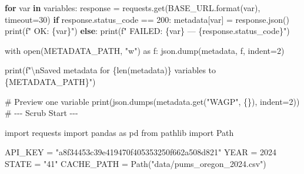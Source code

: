 \documentclass[
  letterpaper,
  DIV=11,
  numbers=noendperiod]{scrartcl}
\newenvironment{Shaded}{\begin{snugshade}}{\end{snugshade}}
\newcommand{\AttributeTok}[1]{\textcolor[rgb]{0.40,0.45,0.13}{#1}}
\newcommand{\CommentTok}[1]{\textcolor[rgb]{0.37,0.37,0.37}{#1}}
\newcommand{\ControlFlowTok}[1]{\textcolor[rgb]{0.00,0.23,0.31}{\textbf{#1}}}
\newcommand{\DecValTok}[1]{\textcolor[rgb]{0.68,0.00,0.00}{#1}}
\newcommand{\FunctionTok}[1]{\textcolor[rgb]{0.28,0.35,0.67}{#1}}
\newcommand{\NormalTok}[1]{\textcolor[rgb]{0.00,0.23,0.31}{#1}}
\newcommand{\OtherTok}[1]{\textcolor[rgb]{0.00,0.23,0.31}{#1}}
\newcommand{\SpecialCharTok}[1]{\textcolor[rgb]{0.37,0.37,0.37}{#1}}
\newcommand{\StringTok}[1]{\textcolor[rgb]{0.13,0.47,0.30}{#1}}
\begin{document}
\begin{Shaded}
\begin{Highlighting}[]
    \ControlFlowTok{for}\NormalTok{ var }\ControlFlowTok{in}\NormalTok{ variables}\SpecialCharTok{:}
\NormalTok{        response }\OtherTok{=} \FunctionTok{requests.get}\NormalTok{(}\FunctionTok{BASE\_URL.format}\NormalTok{(var), }\AttributeTok{timeout=}\DecValTok{30}\NormalTok{)}
        \ControlFlowTok{if}\NormalTok{ response.status\_code }\SpecialCharTok{==} \DecValTok{200}\SpecialCharTok{:}
\NormalTok{            metadata[var] }\OtherTok{=} \FunctionTok{response.json}\NormalTok{()}
            \FunctionTok{print}\NormalTok{(f}\StringTok{"  OK: \{var\}"}\NormalTok{)}
        \ControlFlowTok{else}\SpecialCharTok{:}
            \FunctionTok{print}\NormalTok{(f}\StringTok{"  FAILED: \{var\} — \{response.status\_code\}"}\NormalTok{)}

\NormalTok{    with }\FunctionTok{open}\NormalTok{(METADATA\_PATH, }\StringTok{"w"}\NormalTok{) as f}\SpecialCharTok{:}
        \FunctionTok{json.dump}\NormalTok{(metadata, f, }\AttributeTok{indent=}\DecValTok{2}\NormalTok{)}

    \FunctionTok{print}\NormalTok{(f}\StringTok{"}\SpecialCharTok{\textbackslash{}n}\StringTok{Saved metadata for \{len(metadata)\} variables to \{METADATA\_PATH\}"}\NormalTok{)}

\CommentTok{\# Preview one variable}
\FunctionTok{print}\NormalTok{(}\FunctionTok{json.dumps}\NormalTok{(}\FunctionTok{metadata.get}\NormalTok{(}\StringTok{"WAGP"}\NormalTok{, \{\}), }\AttributeTok{indent=}\DecValTok{2}\NormalTok{))}
\CommentTok{\# {-}{-}{-} Scrub Start {-}{-}{-}}

\NormalTok{import requests}
\NormalTok{import pandas as pd}
\NormalTok{from pathlib import Path}

\NormalTok{API\_KEY }\OtherTok{=} \StringTok{"a8f34453c39e419470f405353250f662a508d821"}
\NormalTok{YEAR }\OtherTok{=} \DecValTok{2024}
\NormalTok{STATE }\OtherTok{=} \StringTok{"41"}
\NormalTok{CACHE\_PATH }\OtherTok{=} \FunctionTok{Path}\NormalTok{(}\StringTok{"data/pums\_oregon\_2024.csv"}\NormalTok{)}


\end{Highlighting}
\end{Shaded}
\end{document}
